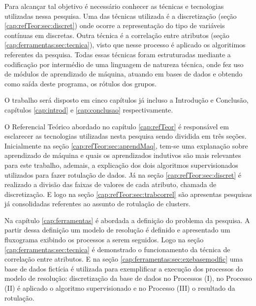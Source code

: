 Para alcançar tal objetivo é necessário conhecer as técnicas e tecnologias utilizadas nessa pesquisa. Uma das técnicas utilizada é a discretização (seção \ref{cap:refTeor:sec:discret}) onde ocorre a representação do tipo de variáveis contínuas em discretas. Outra técnica é a correlação entre atributos (seção \ref{cap:ferramentas:sec:tecnica}), visto que nesse processo é aplicado os algoritimos referentes da pesquisa. Todas essas técnicas foram estruturadas mediante a codificação por intermédio de uma linguagem de natureza técnica, onde fez uso de módulos de aprendizado de máquina, atuando em bases de dados e obtendo como saída deste programa, os rótulos dos grupos. 


O trabalho será disposto em cinco capítulos já incluso  a Introdução e Conclusão, capítulos \ref{cap:introd} e \ref{cap:conclusao} respectivamente.  

O Referencial Teórico abordado no capítulo \ref{cap:refTeor} é responsável em esclarecer as tecnologias utilizadas nesta pesquisa sendo dividida em três seções. Inicialmente na seção \ref{cap:refTeor:sec:aprendMaq}, tem-se uma  explanação sobre aprendizado de máquina e quais os aprendizados indutivos são mais relevantes para este trabalho, ademais, a explicação dos dois algoritmos supervisionados utilizados para fazer rotulação de dados. Já na seção \ref{cap:refTeor:sec:discret} é realizado a divisão das faixas de valores de cada atributo, chamada de discretização. E logo na seção \ref{cap:refTeor:sec:trabcorrel} são apresentas pesquisas já consolidadas  referentes ao assunto de rotulação de clusters.

Na capítulo \ref{cap:ferramentas} é abordada a definição do problema da pesquisa. A partir dessa definição um modelo de resolução é definido e apresentado um fluxograma exibindo os processos a serem seguidos. Logo na seção \ref{cap:ferramentas:sec:tecnica} é demonstrado o funcionamento da técnica de correlação entre atributos. E na seção \ref{cap:ferramentas:sec:exebasemodfic} uma base de dados fictícia é utilizada para exemplificar a execução dos processos do modelo de resolução: discretização da base de dados no Processos (I), no Processo (II) é aplicado o algoritmo supervisionado e no Processo (III) o resultado da rotulação. 

